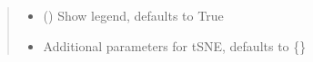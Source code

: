 \documentclass[letterpaper,10pt,english]{sphinxmanual}
\begin{document}
\begin{fulllineitems}
\begin{quote}
\begin{description}
\begin{itemize}
\item {} 
 (\sphinxstyleliteralemphasis{\sphinxupquote{, }}) \textendash{} Show legend, defaults to True

\item {} 
 \textendash{} Additional parameters for t\sphinxhyphen{}SNE,
defaults to \{\}

\end{itemize}

\end{description}\end{quote}

\end{fulllineitems}

\end{document}
